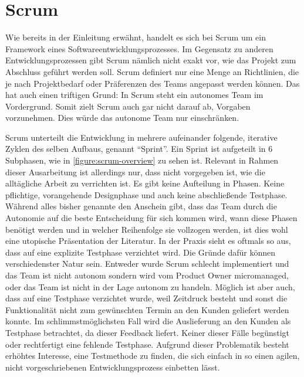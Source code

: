\documentclass[12pt,DIV14,BCOR10mm,a4paper,twoside,parskip=half-,headsepline,headinclude,english,ngerman,bibliography=totocnumbered]{scrreprt}
\begin{document}
\chapter{Scrum}

Wie bereits in der Einleitung erwähnt, handelt es sich bei Scrum um ein Framework eines Softwareentwicklungsprozesses.
Im Gegensatz zu anderen Entwicklungsprozessen gibt Scrum nämlich nicht exakt vor, wie das Projekt zum Abschluss geführt werden soll.
Scrum definiert nur eine Menge an Richtlinien, die je nach Projektbedarf oder Präferenzen des Teams angepasst werden können.
Das hat auch einen triftigen Grund: In Scrum steht ein autonomes Team im Vordergrund.
Somit zielt Scrum auch gar nicht darauf ab, Vorgaben vorzunehmen.
Dies würde das autonome Team nur einschränken.

Scrum unterteilt die Entwicklung in mehrere aufeinander folgende, iterative Zyklen des selben Aufbaus, genannt \enquote{Sprint}.
Ein Sprint ist aufgeteilt in 6 Subphasen, wie in \ref{figure:scrum-overview} zu sehen ist.
Relevant in Rahmen dieser Ausarbeitung ist allerdings nur, dass nicht vorgegeben ist, wie die alltägliche Arbeit zu verrichten ist.
Es gibt keine Aufteilung in Phasen.
Keine pflichtige, vorangehende Designphase und auch keine abschließende Testphase.
Während alles bisher genannte den Anschein gibt, dass das Team durch die Autonomie auf die beste Entscheidung für sich kommen wird, wann diese Phasen benötigt werden und in welcher Reihenfolge sie vollzogen werden, ist dies wohl eine utopische Präsentation der Literatur.
In der Praxis sieht es oftmals so aus, dass auf eine explizite Testphase verzichtet wird.
Die Gründe dafür können verschiedenster Natur sein.
Entweder wurde Scrum schlecht implementiert und das Team ist nicht autonom sondern wird vom Product Owner micromanaged, oder das Team ist nicht in der Lage autonom zu handeln.
Möglich ist aber auch, dass auf eine Testphase verzichtet wurde, weil Zeitdruck besteht und sonst die Funktionalität nicht zum gewünschten Termin an den Kunden geliefert werden konnte.
Im schlimmstmöglichsten Fall wird die Auslieferung an den Kunden als Testphase betrachtet, da dieser Feedback liefert.
Keiner dieser Fälle begünstigt oder rechtfertigt eine fehlende Testphase.
Aufgrund dieser Problematik besteht erhöhtes Interesse, eine Testmethode zu finden, die sich einfach in so einen agilen, nicht vorgeschriebenen Entwicklungsprozess einbetten lässt.
\end{document}

